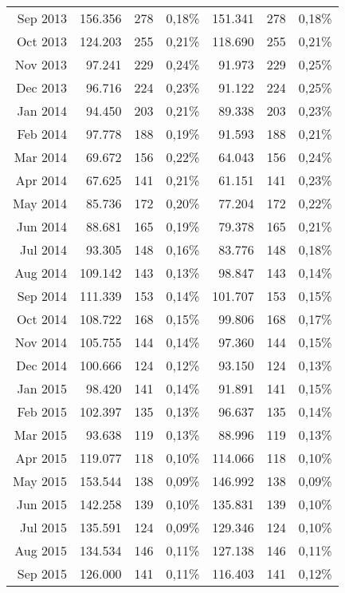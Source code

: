 \begin{longtable}{r|rrr|rrr}
Sep 2013 & 156.356 & 278   & 0,18\% & 151.341 & 278   & 0,18\% \\
Oct 2013 & 124.203 & 255   & 0,21\% & 118.690 & 255   & 0,21\% \\
Nov 2013 & 97.241  & 229   & 0,24\% & 91.973  & 229   & 0,25\% \\
Dec 2013 & 96.716  & 224   & 0,23\% & 91.122  & 224   & 0,25\% \\
Jan 2014 & 94.450  & 203   & 0,21\% & 89.338  & 203   & 0,23\% \\
Feb 2014 & 97.778  & 188   & 0,19\% & 91.593  & 188   & 0,21\% \\
Mar 2014 & 69.672  & 156   & 0,22\% & 64.043  & 156   & 0,24\% \\
Apr 2014 & 67.625  & 141   & 0,21\% & 61.151  & 141   & 0,23\% \\
May 2014 & 85.736  & 172   & 0,20\% & 77.204  & 172   & 0,22\% \\
Jun 2014 & 88.681  & 165   & 0,19\% & 79.378  & 165   & 0,21\% \\
Jul 2014 & 93.305  & 148   & 0,16\% & 83.776  & 148   & 0,18\% \\
Aug 2014 & 109.142 & 143   & 0,13\% & 98.847  & 143   & 0,14\% \\
Sep 2014 & 111.339 & 153   & 0,14\% & 101.707 & 153   & 0,15\% \\
Oct 2014 & 108.722 & 168   & 0,15\% & 99.806  & 168   & 0,17\% \\
Nov 2014 & 105.755 & 144   & 0,14\% & 97.360  & 144   & 0,15\% \\
Dec 2014 & 100.666 & 124   & 0,12\% & 93.150  & 124   & 0,13\% \\
Jan 2015 & 98.420  & 141   & 0,14\% & 91.891  & 141   & 0,15\% \\
Feb 2015 & 102.397 & 135   & 0,13\% & 96.637  & 135   & 0,14\% \\
Mar 2015 & 93.638  & 119   & 0,13\% & 88.996  & 119   & 0,13\% \\
Apr 2015 & 119.077 & 118   & 0,10\% & 114.066 & 118   & 0,10\% \\
May 2015 & 153.544 & 138   & 0,09\% & 146.992 & 138   & 0,09\% \\
Jun 2015 & 142.258 & 139   & 0,10\% & 135.831 & 139   & 0,10\% \\
Jul 2015 & 135.591 & 124   & 0,09\% & 129.346 & 124   & 0,10\% \\
Aug 2015 & 134.534 & 146   & 0,11\% & 127.138 & 146   & 0,11\% \\
Sep 2015 & 126.000 & 141   & 0,11\% & 116.403 & 141   & 0,12\% \\

\end{longtable}
